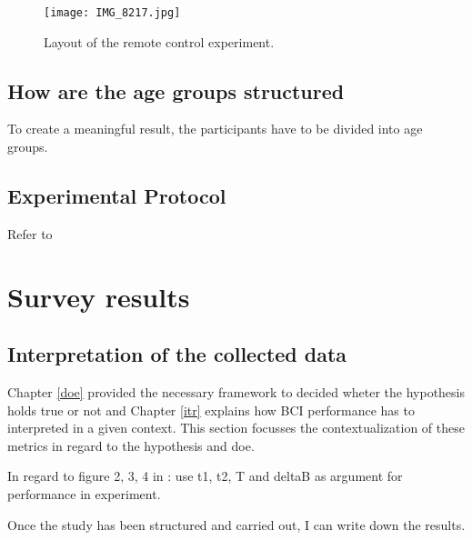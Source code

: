             \begin{figure}[h]     %
                \centering
                \texttt{[image: IMG\_8217.jpg]} 
                \caption{Layout of the remote control experiment.}\label{gui-remote}
            \end{figure}            

        \section{How are the age groups structured}

            To create a meaningful result, the participants have to be divided into age groups.

            \medskip


        \section{Experimental Protocol}


            Refer to \cite{Zerafa.2018}

    \chapter{Survey results}

        \section{Interpretation of the collected data}\label{operationalization}

            Chapter \ref*{doe} provided the necessary framework to decided wheter the hypothesis holds true or not and Chapter \ref*{itr} explains how BCI performance has to interpreted in a given context. This section focusses the contextualization of these metrics in regard to the hypothesis and doe.

            \medskip


            In regard to figure 2, 3, 4 in \cite{Yuan.2013}: use t1, t2, T and deltaB as argument for performance in experiment.    

                Once the study has been structured and carried out, I can write down the results.

